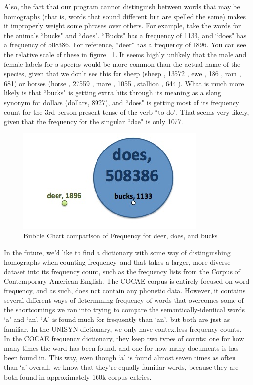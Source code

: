 Also, the fact that our program cannot distinguish between words that may be homographs (that is, words that sound different but are spelled the same) makes it improperly weight some phrases over others. For example, take the words for the animals ``bucks" and ``does".  ``Bucks" has a frequency of 1133, and ``does" has a frequency of 508386.  For reference, ``deer" has a frequency of 1896.  You can see the relative scale of these in figure ~\ref{fig:DoesBucksDeerBubbleGraph}.  It seems highly unlikely that the male and female labels for a species would be more common than the actual name of the species, given that we don't see this for sheep (sheep , 13572 , ewe , 186 , ram , 681) or horses (horse , 27559 , mare , 1055 , stallion , 644 ).  What is much more likely is that ``bucks" is getting extra hits through its meaning as a slang synonym for dollars (dollars, 8927), and ``does" is getting most of its frequency count for the 3rd person present tense of the verb ``to do".  That seems very likely, given that the frequency for the singular ``doe" is only 1077. 
\begin{figure}
\includegraphics{DoesBucksDeerBubbleGraph.jpg}
\captionfonts
\caption[Bubble Chart comparison of Frequency for deer, does, and bucks]{Bubble Chart comparison of Frequency for deer, does, and bucks }
\label{fig:DoesBucksDeerBubbleGraph}
\end{figure}

In the future, we'd like to find a dictionary with some way of distinguishing homographs when counting frequency, and that takes a larger, more-diverse dataset into its frequency count, such as the frequency lists from the Corpus of Contemporary American English\cite{freeFreqList}.   The COCAE corpus is entirely focused on word frequency, and as such, does not contain any phonetic data.  However, it contains several different ways of determining frequency of words that overcomes some of the shortcomings we ran into trying to compare the semantically-identical words `a' and `an'.  `A' is found much for frequently than `an', but both are just as familiar.  In the UNISYN dictionary, we only have contextless frequency counts.  In the COCAE frequency dictionary, they keep two types of counts: one for how many times the word has been found, and one for how many documents is has been found in.  This way, even though `a' is found almost seven times as often than `a' overall, we know that they're equally-familiar words, because they are both found in approximately 160k corpus entries\cite{davies_word_2011}.

